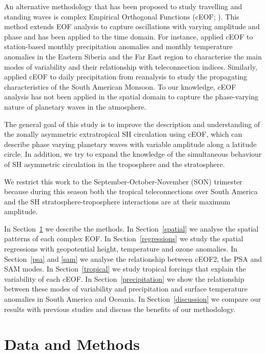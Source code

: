 \documentclass[pdflatex,lineno,sn-basic]{sn-jnl}
\theoremstyle{thmstyleone}%
\theoremstyle{thmstyletwo}%
\theoremstyle{thmstylethree}%
\begin{document}
An alternative methodology that has been proposed to study travelling and standing waves is complex Empirical Orthogonal Functions (cEOF; \citet{horel1984}).
This method extends EOF analysis to capture oscillations with varying amplitude and phase and has been applied to the time domain.
For instance, \citet{krokhin2007} applied cEOF to station-based monthly precipitation anomalies and monthly temperature anomalies in the Eastern Siberia and the Far East region to characterise the main modes of variability and their relationship with teleconnection indices.
Similarly, \citet{gelbrecht2018} applied cEOF to daily precipitation from reanalysis to study the propagating characteristics of the South American Monsoon.
To our knowledge, cEOF analysis has not been applied in the spatial domain to capture the phase-varying nature of planetary waves in the atmosphere.

The general goal of this study is to improve the description and understanding of the zonally asymmetric extratropical SH circulation using cEOF, which can describe phase varying planetary waves with variable amplitude along a latitude circle.
In addition, we try to expand the knowledge of the simultaneous behaviour of SH asymmetric circulation in the troposphere and the stratosphere.

We restrict this work to the September-October-November (SON) trimester because during this season both the tropical teleconnections over South America \citep{cazes-boezio2003} and the SH stratosphere-troposphere interactions \citep{lim2018} are at their maximum amplitude.

In Section~\ref{methods} we describe the methods.
In Section~\ref{spatial} we analyse the spatial patterns of each complex EOF.
In Section~\ref{regressions} we study the spatial regressions with geopotential height, temperature and ozone anomalies.
In Section~\ref{psa} and \ref{sam} we analyse the relationship between cEOF2, the PSA and SAM modes.
In Section~\ref{tropical} we study tropical forcings that explain the variability of each cEOF.
In Section~\ref{precipitation} we show the relationship between these modes of variability and precipitation and surface temperature anomalies in South America and Oceania.
In Section~\ref{discussion} we compare our results with previous studies and discuss the benefits of our methodology.

\hypertarget{methods}{%
\section{Data and Methods}\label{methods}}
\end{document}
